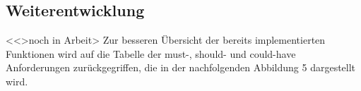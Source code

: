 \subsection{Weiterentwicklung}
<<>noch in Arbeit>
Zur besseren Übersicht der bereits implementierten Funktionen wird auf die Tabelle der must-, should- und could-have Anforderungen zurückgegriffen, die in der nachfolgenden Abbildung 5 dargestellt wird.





